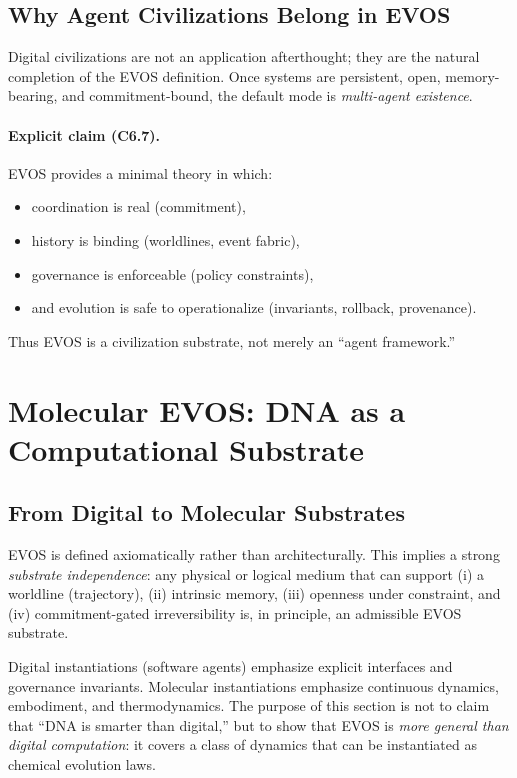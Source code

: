 \documentclass[11pt]{article}
\begin{document}
\subsection{Why Agent Civilizations Belong in EVOS}
\label{sec:why-agent-civilizations}

Digital civilizations are not an application afterthought; they are the natural completion
of the EVOS definition. Once systems are persistent, open, memory-bearing, and commitment-bound,
the default mode is \emph{multi-agent existence}.

\paragraph{Explicit claim (C6.7).}
EVOS provides a minimal theory in which:
\begin{itemize}
  \item coordination is real (commitment),
  \item history is binding (worldlines, event fabric),
  \item governance is enforceable (policy constraints),
  \item and evolution is safe to operationalize (invariants, rollback, provenance).
\end{itemize}
Thus EVOS is a civilization substrate, not merely an ``agent framework.''

\section{Molecular EVOS: DNA as a Computational Substrate}
\label{sec:molecular-evos}

\subsection{From Digital to Molecular Substrates}
\label{sec:from-digital-to-molecular}

EVOS is defined axiomatically rather than architecturally. This implies a strong
\emph{substrate independence}: any physical or logical medium that can support (i) a
worldline (trajectory), (ii) intrinsic memory, (iii) openness under constraint, and
(iv) commitment-gated irreversibility is, in principle, an admissible EVOS substrate.

Digital instantiations (software agents) emphasize explicit interfaces and governance
invariants. Molecular instantiations emphasize continuous dynamics, embodiment, and
thermodynamics. The purpose of this section is not to claim that ``DNA is smarter than
digital,'' but to show that EVOS is \emph{more general than digital computation}: it
covers a class of dynamics that can be instantiated as chemical evolution laws.
\end{document}
